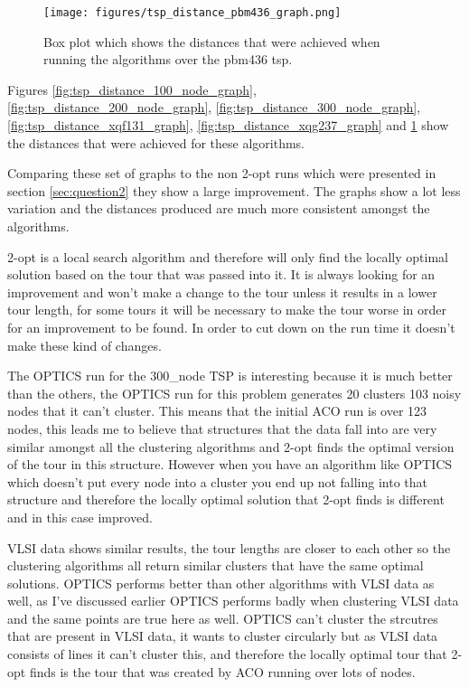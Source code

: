 \begin{figure}
    \centering
    \texttt{[image: figures/tsp\_distance\_pbm436\_graph.png]}
    \caption{Box plot which shows the distances that were achieved when running the algorithms over the pbm436 tsp.}
    \label{fig:tsp_distance_pbm436_graph}
\end{figure}

Figures \ref{fig:tsp_distance_100_node_graph},  \ref{fig:tsp_distance_200_node_graph},  \ref{fig:tsp_distance_300_node_graph},  \ref{fig:tsp_distance_xqf131_graph},  \ref{fig:tsp_distance_xqg237_graph} and  \ref{fig:tsp_distance_pbm436_graph} show the distances that were achieved for these algorithms.

Comparing these set of graphs to the non 2-opt runs which were presented in section \ref{sec:question2} they show a large improvement. The graphs show a lot less variation and the distances produced are much more consistent amongst the algorithms. 

2-opt is a local search algorithm and therefore will only find the locally optimal solution based on the tour that was passed into it. It is always looking for an improvement and won't make a change to the tour unless it results in a lower tour length, for some tours it will be necessary to make the tour worse in order for an improvement to be found. In order to cut down on the run time it doesn't make these kind of changes. 

The OPTICS run for the 300\_node TSP is interesting because it is much better than the others, the OPTICS run for this problem generates 20 clusters 103 noisy nodes that it can't cluster. This means that the initial ACO run is over 123 nodes, this leads me to believe that structures that the data fall into are very similar amongst all the clustering algorithms and 2-opt finds the optimal version of the tour in this structure. However when you have an algorithm like OPTICS which doesn't put every node into a cluster you end up not falling into that structure and therefore the locally optimal solution that 2-opt finds is different and in this case improved.

VLSI data shows similar results, the tour lengths are closer to each other so the clustering algorithms all return similar clusters that have the same optimal solutions. OPTICS performs better than other algorithms with VLSI data as well, as I've discussed earlier OPTICS performs badly when clustering VLSI data and the same points are true here as well. OPTICS can't cluster the strcutres that are present in VLSI data, it wants to cluster circularly but as VLSI data consists of lines it can't cluster this, and therefore the locally optimal tour that 2-opt finds is the tour that was created by ACO running over lots of nodes.

